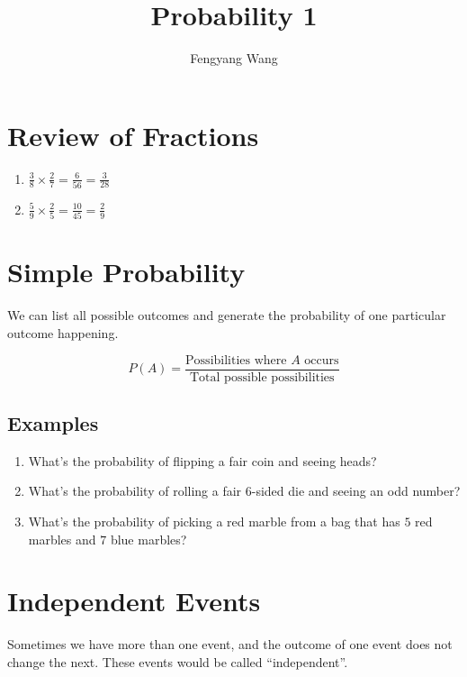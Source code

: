 \documentclass[letterpaper,10pt]{article}
\title{Probability 1}
\author{Fengyang Wang}
\begin{document}
\maketitle

\section{Review of Fractions}
\begin{enumerate}
 \item \(
        \frac{3}{8} \times \frac{2}{7} = \frac{6}{56} = \frac{3}{28}
       \)
 \item \(\frac{5}{9} \times \frac{2}{5} = \frac{10}{45} = \frac{2}{9}\)

\end{enumerate}

\section{Simple Probability}

We can list all possible outcomes and generate the probability of one
particular outcome happening.

\begin{equation}
 P(A) = \frac{\text{Possibilities where $A$ occurs}}{\text{Total possible possibilities}}
\end{equation}

\subsection{Examples}

\begin{enumerate}
 \item What's the probability of flipping a fair coin and seeing heads?
 \item What's the probability of rolling a fair 6-sided die and seeing an odd number?
 \item What's the probability of picking a red marble from a bag that has $5$ red marbles and $7$ blue marbles?
\end{enumerate}

\section{Independent Events}

Sometimes we have more than one event, and the outcome of one event does not change the next. These events
would be called ``independent''.
\end{document}
